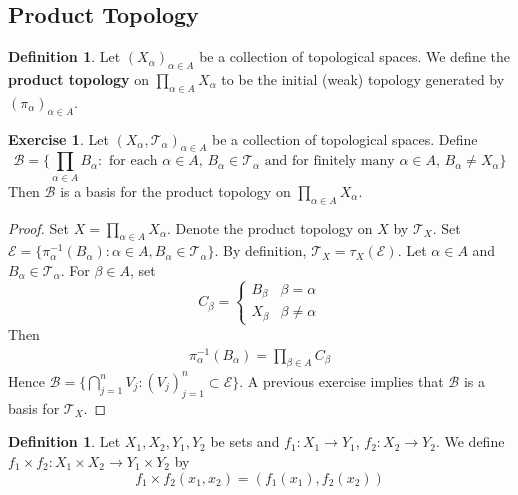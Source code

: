 \documentclass[12pt]{amsart}
\theoremstyle{definition}
\newtheorem{defn}[definition]{Definition}
\newtheorem{ex}[definition]{Exercise}
\newcommand{\al}{\alpha}
\newcommand{\be}{\beta}
\newcommand{\MB}{\mathcal{B}}
\newcommand{\ME}{\mathcal{E}}
\newcommand{\MT}{\mathcal{T}}
\begin{document}
	
	
	
	
	
	
	
	
	
	
	
	
	
	\newpage
	\subsection{Product Topology}
	
	\begin{defn}
	Let $(X_{\al})_{\al \in A}$ be a collection of topological spaces. We define the \textbf{product topology} on $\prod_{\al \in A}X_{\al}$ to be the initial (weak) topology generated by $(\pi_{\al})_{\al \in A}$.
	\end{defn}

	\begin{ex}
		Let $(X_{\al}, \MT_{\al})_{\al \in A}$ be a collection of topological spaces. Define $$\MB = \bigg \{\prod_{\al \in A}B_{\al}: \text{ for each $\al \in A$, } B_{\al} \in \MT_{\al} \text{ and for finitely many $\al \in A$, } B_{\al} \neq X_{\al} \bigg\}$$
		Then $\MB$ is a basis for the product topology on $\prod_{\al \in A}X_{\al}$.
	\end{ex}

	\begin{proof}
		Set $X = \prod_{\al \in A}X_{\al}$. Denote the product topology on $X$ by $\MT_X$. Set $\ME = \{\pi_{\al}^{-1}(B_{\al}): \al \in A, B_{\al} \in \MT_{\al}\}$. By definition, $\MT_{X} = \tau_{X}(\ME)$. Let $\al \in A$ and $B_{\al} \in \MT_{\al}$. For $\be \in A$, set 
		\[
		C_{\be} = 
		\begin{cases}
			B_{\be} & \be = \al \\
			X_{\be} & \be \neq \al
		\end{cases}
		\]
		Then 
		\begin{align*}
			\pi_{\al}^{-1}(B_{\al}) = \prod_{\be \in A} C_{\be}  
		\end{align*}
		Hence $\MB = \bigg \{\bigcap_{j=1}^n V_j:(V_j)_{j=1}^n \subset \ME \bigg \}$. A previous exercise implies that $\MB$ is a basis for $\MT_X$.
	\end{proof}
	
	\begin{defn}
		Let $X_1, X_2,Y_1,Y_2$ be sets and $f_1:X_1 \rightarrow Y_1$, $f_2:X_2 \rightarrow Y_2$. We define $f_1 \times f_2: X_1 \times X_2 \rightarrow Y_1 \times Y_2$ by $$f_1 \times f_2 (x_1, x_2) = (f_1(x_1), f_2(x_2))$$
	\end{defn}
	
\end{document}
